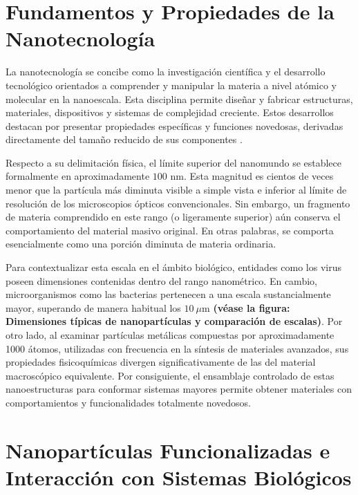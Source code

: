 \section{Fundamentos y Propiedades de la Nanotecnología}

La nanotecnología se concibe como la investigación científica y el desarrollo tecnológico orientados a comprender y manipular la materia a nivel atómico y molecular en la nanoescala. Esta disciplina permite diseñar y fabricar estructuras, materiales, dispositivos y sistemas de complejidad creciente. Estos desarrollos destacan por presentar propiedades específicas y funciones novedosas, derivadas directamente del tamaño reducido de sus componentes \cite{domingo2010nanotecnologia}.

Respecto a su delimitación física, el límite superior del nanomundo se establece formalmente en aproximadamente $100\text{ nm}$. Esta magnitud es cientos de veces menor que la partícula más diminuta visible a simple vista e inferior al límite de resolución de los microscopios ópticos convencionales. Sin embargo, un fragmento de materia comprendido en este rango (o ligeramente superior) aún conserva el comportamiento del material masivo original. En otras palabras, se comporta esencialmente como una porción diminuta de materia ordinaria.

Para contextualizar esta escala en el ámbito biológico, entidades como los virus poseen dimensiones contenidas dentro del rango nanométrico. En cambio, microorganismos como las bacterias pertenecen a una escala sustancialmente mayor, superando de manera habitual los $10\ \mu\text{m}$ \textbf{(véase la figura: Dimensiones típicas de nanopartículas y comparación de escalas)}. Por otro lado, al examinar partículas metálicas compuestas por aproximadamente 1000 átomos, utilizadas con frecuencia en la síntesis de materiales avanzados, sus propiedades fisicoquímicas divergen significativamente de las del material macroscópico equivalente. Por consiguiente, el ensamblaje controlado de estas nanoestructuras para conformar sistemas mayores permite obtener materiales con comportamientos y funcionalidades totalmente novedosos.
\section{Nanopartículas Funcionalizadas e Interacción con Sistemas Biológicos}

